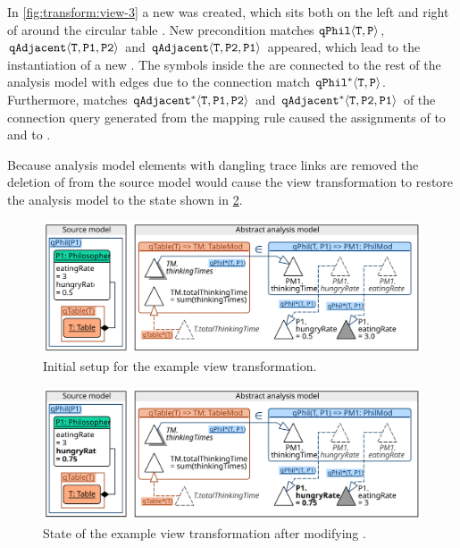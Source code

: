 \begin{runningExample}
  In \vref{fig:transform:view-3} a new   was created, which sits both on the left and right of  around the circular table . New precondition matches \(\texttt{\upshape qPhil}\langle \texttt{\upshape T}, \texttt{\upshape P} \rangle\), \(\texttt{\upshape qAdjacent}\langle \texttt{\upshape T}, \texttt{\upshape P1}, \texttt{\upshape P2} \rangle\) and \(\texttt{\upshape qAdjacent}\langle \texttt{\upshape T}, \texttt{\upshape P2}, \texttt{\upshape P1} \rangle\) appeared, which lead to the instantiation of a new  . The symbols inside the  are connected to the rest of the analysis model with edges due to the connection match \(\texttt{\upshape qPhil}^*\langle \texttt{\upshape T}, \texttt{\upshape P} \rangle\). Furthermore, matches \(\texttt{\upshape qAdjacent}^*\langle \texttt{\upshape T}, \texttt{\upshape P1}, \texttt{\upshape P2} \rangle\) and \(\texttt{\upshape qAdjacent}^*\langle \texttt{\upshape T}, \texttt{\upshape P2}, \texttt{\upshape P1} \rangle\) of the connection query generated from the mapping rule  caused the assignments of  to  and  to .

  Because analysis model elements with dangling trace links are removed the deletion of  from the source model would cause the view transformation to restore the analysis model to the state shown in \cref{fig:transform:view-2}.
\end{runningExample}

\begin{figure}
  \centering
  \includegraphics[scale=0.9]{figures/view_transformation_example_initial} 
  \caption{Initial setup for the example view transformation.}
  \label{fig:transform:view-1}
\end{figure}

\begin{figure}
  \centering
  \includegraphics[scale=0.9]{figures/view_transformation_example_2}
  \caption{State of the example view transformation after modifying .}
  \label{fig:transform:view-2}
\end{figure}


